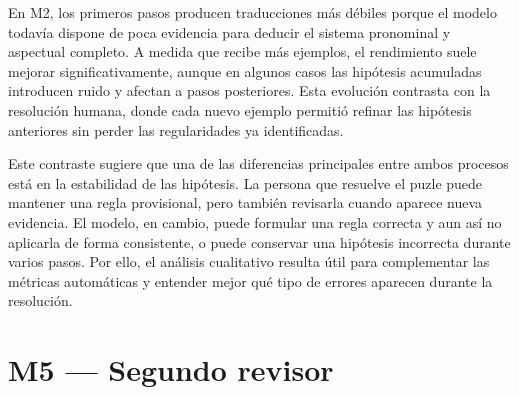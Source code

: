 En M2, los primeros pasos producen traducciones más débiles porque el modelo todavía dispone de poca evidencia para deducir el sistema pronominal y aspectual completo. A medida que recibe más ejemplos, el rendimiento suele mejorar significativamente, aunque en algunos casos las hipótesis acumuladas introducen ruido y afectan a pasos posteriores. Esta evolución contrasta con la resolución humana, donde cada nuevo ejemplo permitió refinar las hipótesis anteriores sin perder las regularidades ya identificadas.

Este contraste sugiere que una de las diferencias principales entre ambos procesos está en la estabilidad de las hipótesis. La persona que resuelve el puzle puede mantener una regla provisional, pero también revisarla cuando aparece nueva evidencia. El modelo, en cambio, puede formular una regla correcta y aun así no aplicarla de forma consistente, o puede conservar una hipótesis incorrecta durante varios pasos. Por ello, el análisis cualitativo resulta útil para complementar las métricas automáticas y entender mejor qué tipo de errores aparecen durante la resolución.

\section{M5 — Segundo revisor}
\label{sec:resultados_m5}


